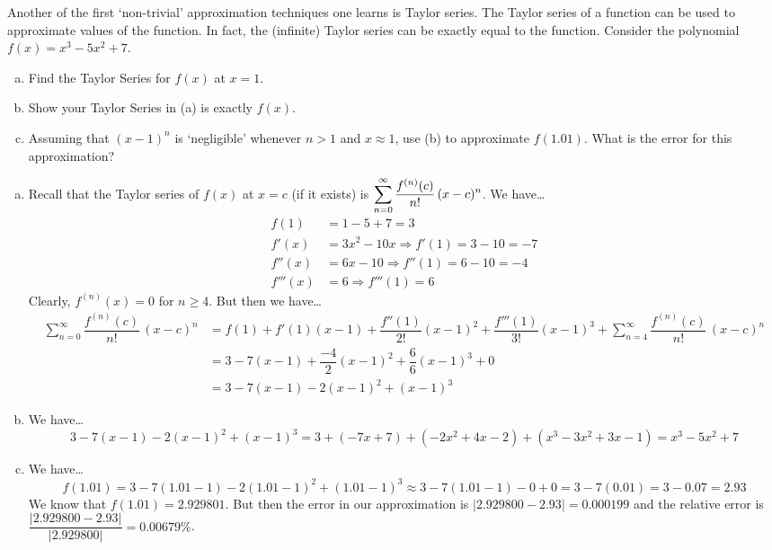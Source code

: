 \documentclass[11pt,letterpaper]{article}
\begin{document}
\newpage



 Another of the first `non-trivial' approximation techniques one learns is Taylor series. The Taylor series of a function can be used to approximate values of the function. In fact, the (infinite) Taylor series can be exactly equal to the function. Consider the polynomial $f(x)= x^3 - 5x^2 + 7$. 
	\begin{enumerate}[(a)]
	\item Find the Taylor Series for $f(x)$ at $x= 1$. 
	\item Show your Taylor Series in (a) is exactly $f(x)$. 
	\item Assuming that $(x - 1)^n$ is `negligible' whenever $n > 1$ and $x \approx 1$, use (b) to approximate $f(1.01)$. What is the error for this approximation? 
	\end{enumerate} \pspace

\sol 
\begin{enumerate}[(a)]
\item Recall that the Taylor series of $f(x)$ at $x= c$ (if it exists) is $\displaystyle \sum_{n=0}^\infty \dfrac{f^{(n)}(c)}{n!} \, (x - c)^n$. We have\dots
	\[
	\begin{aligned}
	f(1)&= 1 - 5 + 7= 3 \\
	f'(x)&= 3x^2 - 10x \Rightarrow f'(1)= 3 - 10= -7 \\
	f''(x)&= 6x - 10 \Rightarrow f''(1)= 6 - 10= -4 \\
	f'''(x)&= 6 \Rightarrow f'''(1)= 6
	\end{aligned}
	\]
Clearly, $f^{(n)}(x)= 0$ for $n \geq 4$. But then we have\dots 
	\[
	\begin{aligned}
	\sum_{n=0}^\infty \dfrac{f^{(n)}(c)}{n!} \, (x - c)^n&= f(1) + f'(1) (x - 1) + \dfrac{f''(1)}{2!} (x - 1)^2 + \dfrac{f'''(1)}{3!} (x - 1)^3 + \sum_{n=4}^\infty \dfrac{f^{(n)}(c)}{n!} \, (x - c)^n \\
	&= 3 - 7(x - 1) + \dfrac{-4}{2} (x - 1)^2 + \dfrac{6}{6} (x - 1)^3 + 0 \\
	&= 3 - 7(x - 1) - 2(x - 1)^2 + (x - 1)^3
	\end{aligned}
	\]

\item We have\dots
	\[
	3 - 7(x - 1) - 2(x - 1)^2 + (x - 1)^3= 3 + (-7x + 7) + (-2x^2 + 4x - 2) + (x^3 - 3x^2 + 3x - 1)= x^3 - 5x^2 + 7
	\]

\item We have\dots
	\[
	f(1.01)= 3 - 7(1.01 - 1) - 2(1.01 - 1)^2 + (1.01 - 1)^3 \approx 3 - 7(1.01 - 1) - 0 + 0= 3 - 7(0.01)= 3 - 0.07= 2.93
	\]
We know that $f(1.01)= 2.929801$. But then the error in our approximation is $|2.929800 - 2.93|= 0.000199$ and the relative error is $\dfrac{|2.929800 - 2.93|}{|2.929800|}= 0.00679\%$. 
\end{enumerate}
\end{document}

